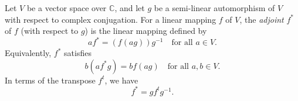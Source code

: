 Let $V$ be a vector space over $\mathbb{C}$, and let $g$ be a semi-linear automorphism of $V$ with respect to complex conjugation. For a linear mapping $f$ of $V$, the \textit{adjoint} $f^*$ of $f$ (with respect to $g$) is the linear mapping defined by
$$af^* = (f(ag))g^{-1} \quad \text{for all } a \in V.$$
Equivalently, $f^*$ satisfies
$$b(af^*g) = bf(ag) \quad \text{for all } a, b \in V.$$
In terms of the transpose $f^t$, we have
$$f^* = g f^t g^{-1}.$$
